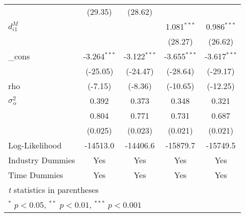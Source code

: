 \begin{center}
\begin{tabular}{l*{4}{c}}
                    &     (29.35)         &     (28.62)         &                     &                     \\
[1em]                
$d_{i1}^{M}$          &                    &                     &       1.081$^{***}$&       0.986$^{***}$\\
                    &                     &                     &     (28.27)         &     (26.62)         \\
[1em]                
\_cons              &      -3.264$^{***}$&      -3.122$^{***}$&      -3.655$^{***}$&      -3.617$^{***}$\\
                    &    (-25.05)         &    (-24.47)         &    (-28.64)         &    (-29.17)         \\
rho                 &     (-7.15)         &     (-8.36)         &    (-10.65)         &    (-12.25)         \\
$\sigma^{2}_{\alpha}$   &    0.392         &       0.373         &       0.348         &       0.321         \\
                     &       0.804         &       0.771         &       0.731&       0.687         \\
                    &  (0.025) & (0.023)& (0.021)& (0.021) \\
Log-Likelihood      &    -14513.0         &    -14406.6         &    -15879.7         &    -15749.5         \\
\hline\hline
Industry Dummies & Yes& Yes& Yes& Yes\\
Time Dummies& Yes& Yes& Yes& Yes\\
\hline\hline
\multicolumn{5}{l}{\footnotesize \textit{t} statistics in parentheses}\\
\multicolumn{5}{l}{\footnotesize $^{*}$ \(p<0.05\), $^{**}$ \(p<0.01\), $^{***}$ \(p<0.001\)}\\
\end{tabular}
\end{center}